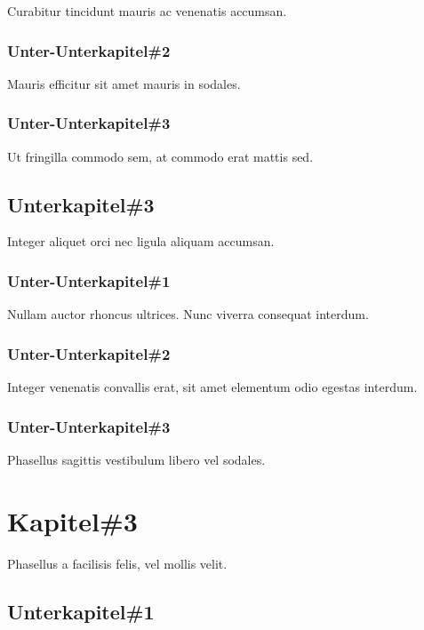 Curabitur tincidunt mauris ac venenatis accumsan. 

\subsubsection{Unter-Unterkapitel\#2}

Mauris efficitur sit amet mauris in sodales. 

\subsubsection{Unter-Unterkapitel\#3}

Ut fringilla commodo sem, at commodo erat mattis sed. 

\subsection{Unterkapitel\#3}

Integer aliquet orci nec ligula aliquam accumsan. 

\subsubsection{Unter-Unterkapitel\#1}

Nullam auctor rhoncus ultrices. Nunc viverra consequat interdum. 

\subsubsection{Unter-Unterkapitel\#2}

Integer venenatis convallis erat, sit amet elementum odio egestas interdum. 

\subsubsection{Unter-Unterkapitel\#3}

Phasellus sagittis vestibulum libero vel sodales. 

\section{Kapitel\#3}

Phasellus a facilisis felis, vel mollis velit. 

\subsection{Unterkapitel\#1}


